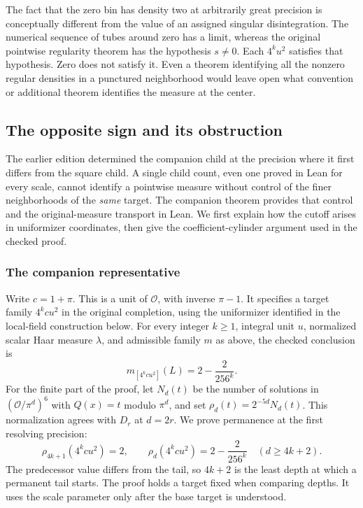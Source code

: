 \documentclass[12pt,letterpaper]{article}
\begin{document}
The fact that the zero bin has density two at arbitrarily great precision is conceptually different from the value of an assigned singular disintegration. The numerical sequence of tubes around zero has a limit, whereas the original pointwise regularity theorem has the hypothesis $s\ne0$. Each $4^ku^2$ satisfies that hypothesis. Zero does not satisfy it. Even a theorem identifying all the nonzero regular densities in a punctured neighborhood would leave open what convention or additional theorem identifies the measure at the center.

\subsection{The opposite sign and its obstruction}
\label{sec:companion-fiber}
The earlier edition determined the companion child at the precision where it first differs from the square child. A single child count, even one proved in Lean for every scale, cannot identify a pointwise measure without control of the finer neighborhoods of the \emph{same} target. The companion theorem provides that control and the original-measure transport in Lean. We first explain how the cutoff arises in uniformizer coordinates, then give the coefficient-cylinder argument used in the checked proof.

\subsubsection{The companion representative}
Write $c=1+\pi$. This is a unit of $\mathcal O$, with inverse $\pi-1$. It specifies a target family $4^kcu^2$ in the original completion, using the uniformizer identified in the local-field construction below. For every integer $k\geq 1$, integral unit $u$, normalized scalar Haar measure $\lambda$, and admissible family $m$ as above, the checked conclusion is
\begin{equation}
  m_{[4^kcu^2]}(L)=2-\frac{2}{256^k}.
  \label{eq:companion-mass}
\end{equation}
For the finite part of the proof, let $N_d(t)$ be the number of solutions in $(\mathcal O/\pi^d)^6$ with $Q(x)=t$ modulo $\pi^d$, and set $\rho_d(t)=2^{-5d}N_d(t)$. This normalization agrees with $D_r$ at $d=2r$. We prove permanence at the first resolving precision:
\[
  \rho_{4k+1}(4^kcu^2)=2,\qquad
  \rho_d(4^kcu^2)=2-\frac{2}{256^k}\quad(d\geq 4k+2).
\]
The predecessor value differs from the tail, so $4k+2$ is the least depth at which a permanent tail starts. The proof holds a target fixed when comparing depths. It uses the scale parameter only after the base target is understood.
\end{document}

